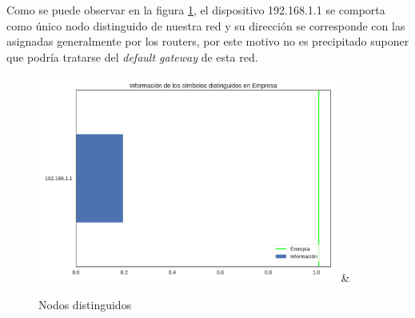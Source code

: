  Como se puede observar en la figura \ref{fig:distinguidos-empresa}, el dispositivo 192.168.1.1 se comporta como único nodo distinguido de nuestra red y su dirección se corresponde con las asignadas generalmente por los routers, por este motivo no es precipitado suponer que podría tratarse del \emph{default gateway} de esta red.

\begin{figure}[H]
   \centering
       \includegraphics[page=1, height=6.8cm ,width=\textwidth]{../img/distinguidos-Empresa} &
 \caption{Nodos distinguidos}
 \label{fig:distinguidos-empresa}
\end{figure}


